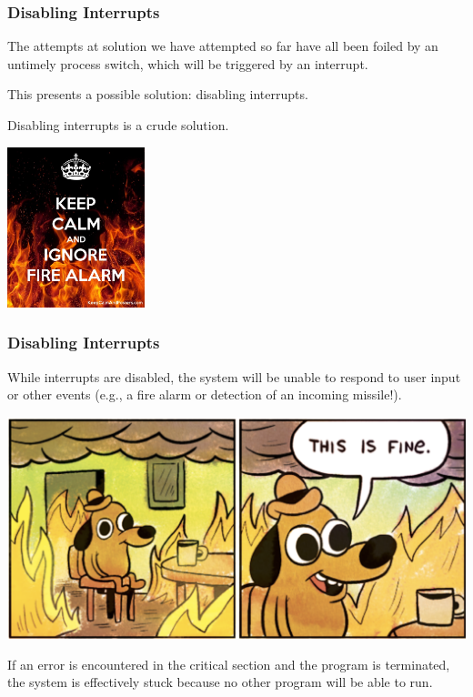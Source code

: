 \begin{frame}
	\frametitle{Disabling Interrupts}

	The attempts at solution we have attempted so far have all been foiled by an untimely process switch, which will be triggered by an interrupt.

	This presents a possible solution: disabling interrupts.

	Disabling interrupts is a crude solution.

	\begin{center}
		\includegraphics[width=0.3\textwidth]{images/ignorefirealarm.jpg}
	\end{center}


\end{frame}

\begin{frame}
	\frametitle{Disabling Interrupts}

	While interrupts are disabled, the system will be unable to respond to user input or other events (e.g., a fire alarm or detection of an incoming missile!).

	\begin{center}
		\includegraphics[width=\textwidth]{images/thisisfine.png}
	\end{center}

	If an error is encountered in the critical section and the program is terminated, the system is effectively stuck because no other program will be able to run.


\end{frame}

